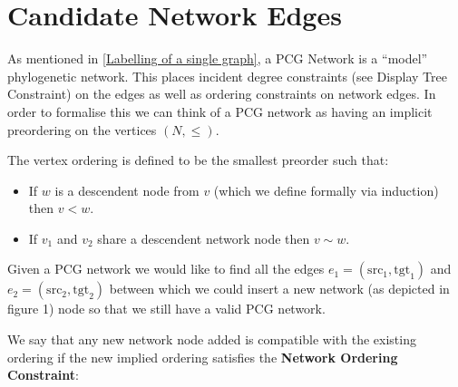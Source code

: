 \documentclass[11pt]{article}
\begin{document}
\newpage 

\section{Candidate Network Edges}\label{Candidate Network Edges}
 As mentioned in \ref{Labelling of a single graph}, a PCG Network is a ``model'' phylogenetic network. This places incident degree constraints (see Display Tree Constraint) on the edges as well as ordering constraints on network edges. In order to formalise this we can think of a PCG network as having an implicit preordering  on the vertices $(N, \leq )$. 


\vspace{2mm}
\begin{center}
\noindent{}
\end{center}

\noindent The vertex ordering is defined to be the smallest preorder such that:
\begin{itemize}
\item If $w$ is a descendent node from $v$ (which we define formally via induction) then $v < w$.
\item If $v_1$ and $v_2$ share a descendent network node then $v \sim w$.
\end{itemize}

\vspace{2mm}


Given a PCG network we would like to find all the edges $e_1= (\mathrm{src}_1, \mathrm{tgt}_1)$ and $e_2 = (\mathrm{src}_2, \mathrm{tgt}_2)$ between which we could insert a new network (as depicted in figure 1) node so that we still have a valid PCG network.

We say that any new network node added is compatible with the existing ordering if the new implied ordering satisfies the \textbf{Network Ordering Constraint}:

\vspace{4mm}
\vspace{4mm}
\end{document}
